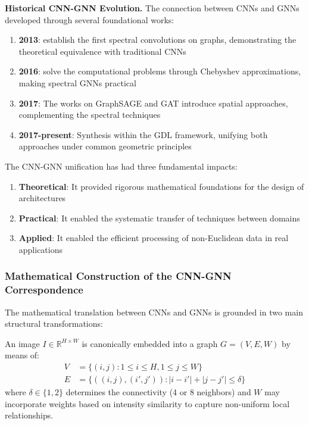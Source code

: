 \textbf{Historical CNN-GNN Evolution.} The connection between \glspl{CNN} and \glspl{GNN} developed through several foundational works:

\begin{enumerate}
    \item \textbf{2013}: \citet{bruna2014spectralnetworkslocallyconnected} establish the first spectral convolutions on graphs, demonstrating the theoretical equivalence with traditional \glspl{CNN}

    \item \textbf{2016}: \citet{defferrard2017convolutionalneuralnetworksgraphs} solve the computational problems through Chebyshev approximations, making spectral \glspl{GNN} practical

    \item \textbf{2017}: The works on GraphSAGE and GAT introduce spatial approaches, complementing the spectral techniques

    \item \textbf{2017-present}: Synthesis within the \gls{GDL} framework, unifying both approaches under common geometric principles
\end{enumerate}

\begin{remark}\label{rem:impacto_marco_unificado}
The CNN-GNN unification has had three fundamental impacts:
\begin{enumerate}
    \item \textbf{Theoretical}: It provided rigorous mathematical foundations for the design of architectures
    \item \textbf{Practical}: It enabled the systematic transfer of techniques between domains
    \item \textbf{Applied}: It enabled the efficient processing of non-Euclidean data in real applications
\end{enumerate}
\end{remark}

\subsubsection{Mathematical Construction of the CNN-GNN Correspondence}

The mathematical translation between CNNs and GNNs is grounded in two main structural transformations:

\begin{definition}\label{def:inmersion_imagen_grafo}
An image $I \in \mathbb{R}^{H \times W}$ is canonically embedded into a graph $G = (V, E, W)$ by means of:
\begin{align}
V &= \{(i,j) : 1 \leq i \leq H, 1 \leq j \leq W\} \\
E &= \{((i,j), (i',j')) : |i-i'| + |j-j'| \leq \delta\}
\end{align}
where $\delta \in \{1, 2\}$ determines the connectivity (4 or 8 neighbors) and $W$ may incorporate weights based on intensity similarity to capture non-uniform local relationships.
\end{definition}

